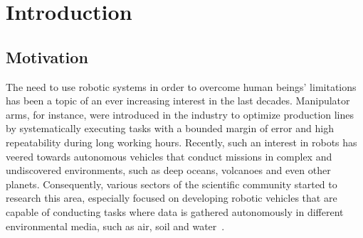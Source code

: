 

\chapter{Introduction}\label{ch:introduction}

\ifpdf
    \graphicspath{{1_introduction/figures/PNG/}{1_introduction/figures/PDF/}{1_introduction/figures/}}
\else
    \graphicspath{{1_introduction/figures/EPS/}{1_introduction/figures/}}
\fi





\section{Motivation}

The need to use robotic systems in order to overcome human beings' limitations
has been a topic of an ever increasing interest in the last decades. Manipulator
arms, for instance, were introduced in the industry to optimize production lines
by systematically executing tasks with a bounded margin of error and high
repeatability during long working hours. Recently, such an interest in robots
has veered towards autonomous vehicles that conduct missions in complex and
undiscovered environments, such as deep oceans, volcanoes and even other
planets. Consequently, various sectors of the scientific community started to
research this area, especially focused on developing robotic vehicles that are
capable of conducting tasks where data is gathered autonomously in different
environmental media, such as air, soil and water~\cite{Dunbabin2012}.

